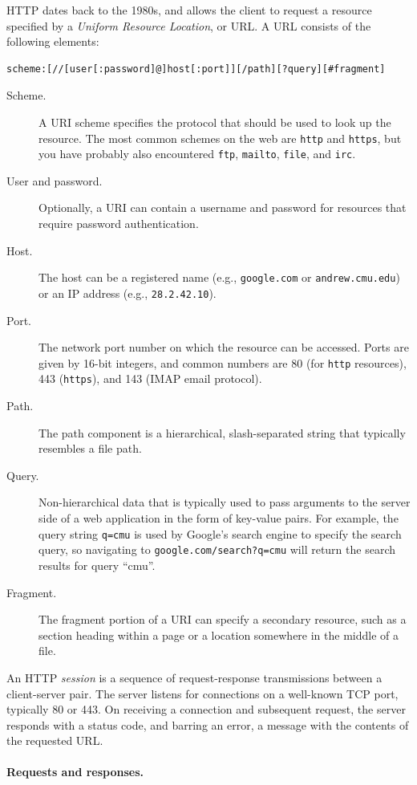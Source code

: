 \documentclass[11pt,twoside]{scrartcl}
\begin{document}
HTTP dates back to the 1980s, and allows the client to request a resource specified by a \emph{Uniform Resource Location}, or URL.
A URL consists of the following elements:
\begin{verbatim}
scheme:[//[user[:password]@]host[:port]][/path][?query][#fragment]
\end{verbatim}
\begin{description}
\item[Scheme.] A URI scheme specifies the protocol that should be used to look up the resource. The most common schemes on the web are \verb'http' and \verb'https', but you have probably also encountered \verb'ftp', \verb'mailto', \verb'file', and \verb'irc'.
\item[User and password.] Optionally, a URI can contain a username and password for resources that require password authentication.
\item[Host.] The host can be a registered name (e.g., \verb'google.com' or \verb'andrew.cmu.edu') or an IP address (e.g., \verb'28.2.42.10').
\item[Port.] The network port number on which the resource can be accessed. Ports are given by 16-bit integers, and common numbers are 80 (for \verb'http' resources), 443 (\verb'https'), and 143 (IMAP email protocol).
\item[Path.] The path component is a hierarchical, slash-separated string that typically resembles a file path.
\item[Query.] Non-hierarchical data that is typically used to pass arguments to the server side of a web application in the form of key-value pairs. For example, the query string \verb'q=cmu' is used by Google's search engine to specify the search query, so navigating to \verb'google.com/search?q=cmu' will return the search results for query ``cmu''.
\item[Fragment.] The fragment portion of a URI can specify a secondary resource, such as a section heading within a page or a location somewhere in the middle of a file.
\end{description}

An HTTP \emph{session} is a sequence of request-response transmissions between a client-server pair.
The server listens for connections on a well-known TCP port, typically 80 or 443.
On receiving a connection and subsequent request, the server responds with a status code, and barring an error, a message with the contents of the requested URL.

\paragraph{Requests and responses.}
\end{document}

